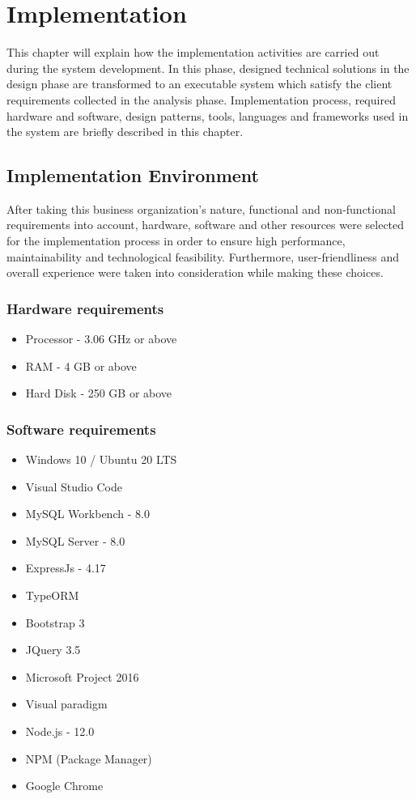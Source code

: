 \documentclass[12pt]{report}
\begin{document}
\newpage
\chapter{Implementation}
This chapter will explain how the implementation activities are carried out during the system development. In this phase, designed technical solutions in the design phase are transformed to an executable system which satisfy the client requirements collected in the analysis phase. Implementation process,   required hardware and software, design patterns, tools, languages and frameworks used in the system are briefly described in this chapter.

\section{Implementation Environment}
After taking this business organization's nature, functional and non-functional requirements into account, hardware, software and other resources were selected for the implementation process in order to ensure high performance, maintainability and technological feasibility. Furthermore, user-friendliness and overall experience were taken into consideration while making these choices.

\subsection{Hardware requirements}
\begin{itemize}
	\item Processor - 3.06 GHz or above
	\item RAM - 4 GB or above
	\item Hard Disk - 250 GB or above
\end{itemize}

\subsection{Software requirements}
\begin{itemize}
	\item Windows 10 / Ubuntu 20 LTS
	\item Visual Studio Code
	\item MySQL Workbench - 8.0
	\item MySQL Server - 8.0
	\item ExpressJs - 4.17
	\item TypeORM
	\item Bootstrap 3
	\item JQuery 3.5
	\item Microsoft Project 2016
	\item Visual paradigm
	\item Node.js - 12.0
	\item NPM (Package Manager)
	\item Google Chrome
\end{itemize}
\end{document}
